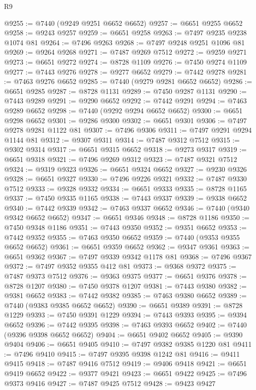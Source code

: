 \begin{lexlean}{R9}
\begin{coremodule}
{{{{{{{{{{{{{{{{{{{{{{{{{{{{{{{{{{{{{{{{{{{{{{{{{{{{{{{{{{{{{{{{{{{{{{{{{{{{{{{{{{{{@9255 := @7440 (@9249 @9251 @6652 @6652)
@9257 := @6651 @9255 @6652
@9258 := @9243 @9257
@9259 := @6651 @9258
@9263 := @7497 @9235 @9238 @1074 @81
@9264 := @7496 @9263
@9268 := @7497 @9248 @9251 @1096 @81
@9269 := @9264 @9268
@9271 := @7487 @9269 @7512
@9272 := @9259 @9271
@9273 := @6651 @9272
@9274 := @8728 @1109
@9276 := @7450 @9274 @1109
@9277 := @7443 @9276
@9278 := @9277 @6652
@9279 := @7442 @9278
@9281 := @7463 @9276 @6652
@9285 := @7440 (@9279 @9281 @6652 @6652)
@9286 := @6651 @9285
@9287 := @8728 @1131
@9289 := @7450 @9287 @1131
@9290 := @7443 @9289
@9291 := @9290 @6652
@9292 := @7442 @9291
@9294 := @7463 @9289 @6652
@9298 := @7440 (@9292 @9294 @6652 @6652)
@9300 := @6651 @9298 @6652
@9301 := @9286 @9300
@9302 := @6651 @9301
@9306 := @7497 @9278 @9281 @1122 @81
@9307 := @7496 @9306
@9311 := @7497 @9291 @9294 @1144 @81
@9312 := @9307 @9311
@9314 := @7487 @9312 @7512
@9315 := @9302 @9314
@9317 := @6651 @9315 @6652
@9318 := @9273 @9317
@9319 := @6651 @9318
@9321 := @7496 @9269 @9312
@9323 := @7487 @9321 @7512
@9324 := @9319 @9323
@9326 := @6651 @9324 @6652
@9327 := @9230 @9326
@9328 := @6651 @9327
@9330 := @7496 @9226 @9321
@9332 := @7487 @9330 @7512
@9333 := @9328 @9332
@9334 := @6651 @9333
@9335 := @8728 @1165
@9337 := @7450 @9335 @1165
@9338 := @7443 @9337
@9339 := @9338 @6652
@9340 := @7442 @9339
@9342 := @7463 @9337 @6652
@9346 := @7440 (@9340 @9342 @6652 @6652)
@9347 := @6651 @9346
@9348 := @8728 @1186
@9350 := @7450 @9348 @1186
@9351 := @7443 @9350
@9352 := @9351 @6652
@9353 := @7442 @9352
@9355 := @7463 @9350 @6652
@9359 := @7440 (@9353 @9355 @6652 @6652)
@9361 := @6651 @9359 @6652
@9362 := @9347 @9361
@9363 := @6651 @9362
@9367 := @7497 @9339 @9342 @1178 @81
@9368 := @7496 @9367
@9372 := @7497 @9352 @9355 @412 @81
@9373 := @9368 @9372
@9375 := @7487 @9373 @7512
@9376 := @9363 @9375
@9377 := @6651 @9376
@9378 := @8728 @1207
@9380 := @7450 @9378 @1207
@9381 := @7443 @9380
@9382 := @9381 @6652
@9383 := @7442 @9382
@9385 := @7463 @9380 @6652
@9389 := @7440 (@9383 @9385 @6652 @6652)
@9390 := @6651 @9389
@9391 := @8728 @1229
@9393 := @7450 @9391 @1229
@9394 := @7443 @9393
@9395 := @9394 @6652
@9396 := @7442 @9395
@9398 := @7463 @9393 @6652
@9402 := @7440 (@9396 @9398 @6652 @6652)
@9404 := @6651 @9402 @6652
@9405 := @9390 @9404
@9406 := @6651 @9405
@9410 := @7497 @9382 @9385 @1220 @81
@9411 := @7496 @9410
@9415 := @7497 @9395 @9398 @1242 @81
@9416 := @9411 @9415
@9418 := @7487 @9416 @7512
@9419 := @9406 @9418
@9421 := @6651 @9419 @6652
@9422 := @9377 @9421
@9423 := @6651 @9422
@9425 := @7496 @9373 @9416
@9427 := @7487 @9425 @7512
@9428 := @9423 @9427
}}}}}}}}}}}}}}}}}}}}}}}}}}}}}}}}}}}}}}}}}}}}}}}}}}}}}}}}}}}}}}}}}}}}}}}}}}}}}}}}}}}}
\end{coremodule}
\end{lexlean}
